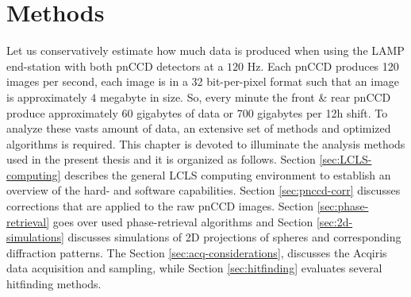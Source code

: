 \chapter{Methods}\label{ch:methods}
Let us conservatively estimate  how much data is produced when using the LAMP end-station with both pnCCD detectors at a $120$ Hz. Each pnCCD produces 120 images per second, each image is in a 32 bit-per-pixel format such that an image is approximately $4$ megabyte in size. So, every minute the front \& rear pnCCD produce approximately $60$ gigabytes of data or 700 gigabytes per 12h shift. To analyze these vasts amount of data, an extensive set of methods and optimized algorithms is required. This chapter is devoted to illuminate the analysis methods used in the present thesis and it is organized as follows. Section \ref{sec:LCLS-computing} describes the general LCLS computing environment to establish an overview of the hard- and software capabilities. Section \ref{sec:pnccd-corr} discusses corrections that are applied to the raw pnCCD images.  Section \ref{sec:phase-retrieval} goes over used phase-retrieval algorithms and Section \ref{sec:2d-simulations} discusses simulations of 2D projections of spheres and corresponding diffraction patterns. The Section \ref{sec:acq-considerations}, discusses the Acqiris data acquisition and sampling, while Section \ref{sec:hitfinding} evaluates several hitfinding methods.
%
%
%
